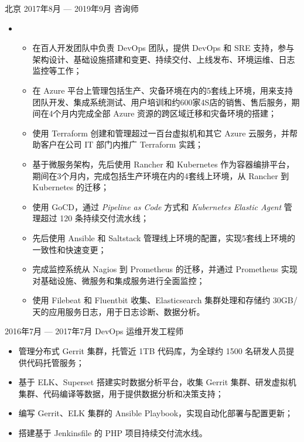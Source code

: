 \documentclass{resume}
\begin{document}
\begin{body}
	{北京}
	{2017年8月 --- 2019年9月}
	{咨询师}
	\begin{itemize}[noitemsep,topsep=0pt]
		\item {}
		\begin{itemize}[noitemsep,topsep=0pt]
			\item 在百人开发团队中负责 DevOps 团队，提供 DevOps 和 SRE 支持，参与架构设计、基础设施搭建和变更、持续交付、上线发布、环境运维、日志监控等工作；
			\item 在 Azure 平台上管理包括生产、灾备环境在内的5套线上环境，用来支持团队开发、集成系统测试、用户培训和约600家4S店的销售、售后服务，期间在4个月内完成全部 Azure 资源的跨区域迁移和灾备环境的搭建；
			\item 使用 Terraform 创建和管理超过一百台虚拟机和其它 Azure 云服务，并帮助客户在公司 IT 部门内推广 Terraform 实践；
			\item 基于微服务架构，先后使用 Rancher 和 Kubernetes 作为容器编排平台，期间在3个月内，完成包括生产环境在内的4套线上环境，从 Rancher 到 Kubernetes 的迁移；
			\item 使用 GoCD，通过 \textit{Pipeline as Code} 方式和 \textit{Kubernetes Elastic Agent} 管理超过 120 条持续交付流水线；
			\item 先后使用 Ansible 和 Saltstack 管理线上环境的配置，实现5套线上环境的一致性和快速变更；
			\item 完成监控系统从 Nagios 到 Prometheus 的迁移，并通过 Prometheus 实现对基础设施、微服务和集成服务进行全面监控；
			\item 使用 Filebeat 和 Fluentbit 收集、Elasticsearch 集群处理和存储约 30GB/天的应用服务日志，用于日志诊断、数据分析。
		\end{itemize}
	\end{itemize}
\end{body}

\smallskip
\begin{body}
	{2016年7月 --- 2017年7月}
	{DevOps 运维开发工程师}
	\begin{itemize}[noitemsep,topsep=0pt]
		\item 管理分布式 Gerrit 集群，托管近 1TB 代码库，为全球约 1500 名研发人员提供代码托管服务；
		\item 基于 ELK、Superset 搭建实时数据分析平台，收集 Gerrit 集群、研发虚拟机集群、代码编译等数据，用于提供数据分析和决策支持；
		\item 编写 Gerrit、ELK 集群的 Ansible Playbook，实现自动化部署与配置更新；
		\item 搭建基于 Jenkinsfile 的 PHP 项目持续交付流水线。
	\end{itemize}
\end{body}
\end{document}
